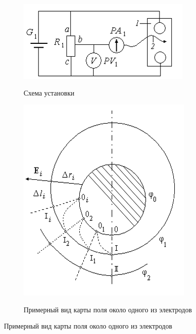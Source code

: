 \documentclass[14pt,a4paper]{extarticle}
\begin{document}
\begin{figure}[!ht]
    \centering
    \begin{subfigure}{.5\textwidth}
        \centering
        \includegraphics[width=0.9\linewidth]{figures/image.png}
        \label{fig:1.1(1)}
        \caption{Схема установки}
    \end{subfigure}%
    \begin{subfigure}{.5\textwidth}
        \centering
        \includegraphics[width=0.7\linewidth]{figures/image2.png}
        \label{fig:1.1(2)}
        \caption{Примерный вид карты поля около одного из электродов}
    \end{subfigure}
\end{figure}

\newpage
$$$$
\newpage
$$$$
\newpage
$$$$
\end{document}
